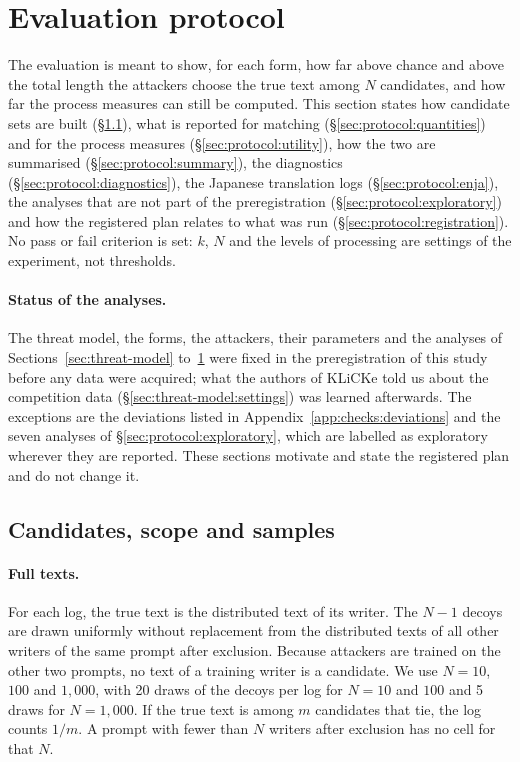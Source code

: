 \section{Evaluation protocol}
\label{sec:protocol}

The evaluation is meant to show, for each form, how far above chance and above the total length the attackers choose
the true text among $N$ candidates, and how far the process measures can still be computed. This section states how
candidate sets are built (\S\ref{sec:protocol:candidates}), what is reported for matching
(\S\ref{sec:protocol:quantities}) and for the process measures (\S\ref{sec:protocol:utility}), how the two are
summarised (\S\ref{sec:protocol:summary}), the diagnostics (\S\ref{sec:protocol:diagnostics}), the Japanese translation
logs (\S\ref{sec:protocol:enja}), the analyses that are not part of the preregistration
(\S\ref{sec:protocol:exploratory}) and how the registered plan relates to what was run
(\S\ref{sec:protocol:registration}). No pass or fail criterion is set: $k$, $N$ and the levels of processing are
settings of the experiment, not thresholds.

\paragraph{Status of the analyses.}
The threat model, the forms, the attackers, their parameters and the analyses of Sections~\ref{sec:threat-model}
to~\ref{sec:protocol} were fixed in the preregistration of this study before any data were acquired; what the authors of
KLiCKe told us about the competition data (\S\ref{sec:threat-model:settings}) was learned afterwards. The
exceptions are the deviations listed in Appendix~\ref{app:checks:deviations} and the seven analyses of
\S\ref{sec:protocol:exploratory}, which are labelled as exploratory wherever they are reported. These sections
motivate and state the registered plan and do not change it.

\subsection{Candidates, scope and samples}
\label{sec:protocol:candidates}

\paragraph{Full texts.}
For each log, the true text is the distributed text of its writer. The $N - 1$ decoys are drawn uniformly without
replacement from the distributed texts of all other writers of the same prompt after exclusion. Because attackers are
trained on the other two prompts, no text of a training writer is a candidate. We use $N = 10$, $100$ and $1{,}000$,
with 20 draws of the decoys per log for $N = 10$ and $100$ and 5 draws for $N = 1{,}000$. If the true text is among
$m$ candidates that tie, the log counts $1/m$. A prompt with fewer than $N$ writers after exclusion has no cell for
that $N$.

